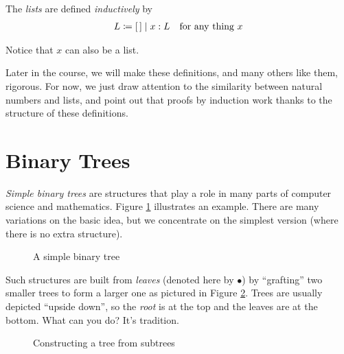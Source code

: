 \begin{defn}
    The \emph{lists} are defined \emph{inductively} by
    \begin{align*}
      L &\coloneqq [\,] \mathrel{\mid} x:L & \text{for any thing $x$}
    \end{align*}
\end{defn}

Notice that $x$ can also be a list.

Later in the course, we will make these definitions, and many others like them, rigorous.
For now, we just draw attention to the similarity between natural numbers and lists, and point out that proofs by induction work thanks to the structure of these definitions.



\section{Binary Trees}

\newcommand{\sz}{\mathord{\textsf{sz}}}
\newcommand{\hght}{\mathord{\textsf{ht}}}

\emph{Simple binary trees} are structures that play a role in many parts of computer science and mathematics.
Figure \ref{fig:BinTree} illustrates an example. There are many variations on the basic idea, but we concentrate
on the simplest version (where there is no extra structure).

\begin{figure}[h]
  \centering
{}
    
  \caption{A simple binary tree}
  \label{fig:BinTree}
\end{figure}

Such structures are built from \emph{leaves} (denoted here by $\bullet$) by ``grafting'' two smaller trees 
to form a larger one
as pictured in Figure \ref{fig:BinTreeConstruction}. Trees are usually depicted ``upside down'', so the \emph{root} is at the top and the leaves are at the bottom. What can you do? It's tradition. 
 

\begin{figure}[h]
  \centering
{}

  \caption{Constructing a tree from subtrees}
  \label{fig:BinTreeConstruction}
\end{figure}


